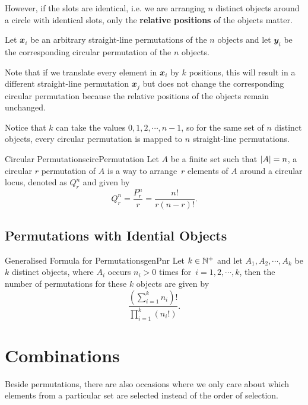 \documentclass[math]{amznotes}
\theoremstyle{remark}
\begin{document}
However, if the slots are identical, i.e. we are arranging $n$ distinct objects around a circle with identical slots, only the {\color{red} \textbf{relative positions}} of the objects matter.

Let $\mathbfit{x}_i$ be an arbitrary straight-line permutations of the $n$ objects and let $\mathbfit{y}_i$ be the corresponding circular permutation of the $n$ objects.

Note that if we translate every element in $\mathbfit{x}_i$ by $k$ positions, this will result in a different straight-line permutation $\mathbfit{x}_j$ but does not change the corresponding circular permutation because the relative positions of the objects remain unchanged.

Notice that $k$ can take the values $0, 1, 2, \cdots, n - 1$, so for the same set of $n$ distinct objects, every circular permutation is mapped to $n$ straight-line permutations.
\begin{dfnbox}{Circular Permutations}{circPermutation}
    Let $A$ be a finite set such that ${\left\lvert {A} \right\rvert} = n$, a circular $r$ permutation of $A$ is a way to arrange~$r$ elements of $A$ around a circular locus, denoted as $Q^n_r$ and given by
    \begin{equation*}
        Q^n_r = \frac{P^n_r}{r} = \frac{n!}{r(n - r)!}.
    \end{equation*}
\end{dfnbox}
\subsection{Permutations with Idential Objects}
\begin{thmbox}{Generalised Formula for Permutations}{genPnr}
    Let $k \in \mathbb{N}^+$ and let $A_1, A_2, \cdots, A_k$ be $k$ distinct objects, where $A_i$ occurs $n_i > 0$ times for~$i = 1, 2, \cdots, k$, then the number of permutations for these $k$ objects are given by
    \begin{equation*}
        \frac{\left(\sum_{i = 1}^{k}n_i\right)!}{\prod_{i = 1}^{k}\left(n_i!\right)}.
    \end{equation*}
\end{thmbox}
\section{Combinations}
Beside permutations, there are also occasions where we only care about which elements from a particular set are selected instead of the order of selection.
\end{document}

